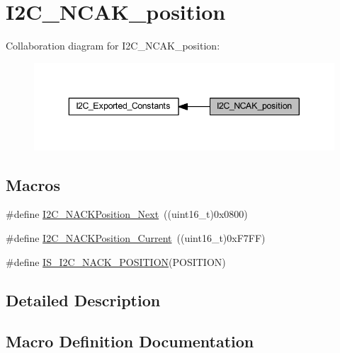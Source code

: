 \hypertarget{group___i2_c___n_c_a_k__position}{}\section{I2\+C\+\_\+\+N\+C\+A\+K\+\_\+position}
\label{group___i2_c___n_c_a_k__position}
Collaboration diagram for I2\+C\+\_\+\+N\+C\+A\+K\+\_\+position\+:
\nopagebreak
\begin{figure}[H]
\begin{center}
\leavevmode
\includegraphics[width=343pt]{group___i2_c___n_c_a_k__position}
\end{center}
\end{figure}
\subsection*{Macros}
\begin{DoxyCompactItemize}
\item 
\#define \hyperlink{group___i2_c___n_c_a_k__position_gacb512a4bd4841a763b6ec51606687fca}{I2\+C\+\_\+\+N\+A\+C\+K\+Position\+\_\+\+Next}~((uint16\+\_\+t)0x0800)
\item 
\#define \hyperlink{group___i2_c___n_c_a_k__position_ga8d91c1e62730a9d927ca8e9ec4f7ef8f}{I2\+C\+\_\+\+N\+A\+C\+K\+Position\+\_\+\+Current}~((uint16\+\_\+t)0x\+F7\+F\+F)
\item 
\#define \hyperlink{group___i2_c___n_c_a_k__position_ga631b4b1674a12aa2b3b27360983029e3}{I\+S\+\_\+\+I2\+C\+\_\+\+N\+A\+C\+K\+\_\+\+P\+O\+S\+I\+T\+I\+ON}(P\+O\+S\+I\+T\+I\+ON)
\end{DoxyCompactItemize}


\subsection{Detailed Description}


\subsection{Macro Definition Documentation}
\mbox{\label{group___i2_c___n_c_a_k__position_ga8d91c1e62730a9d927ca8e9ec4f7ef8f}} 
